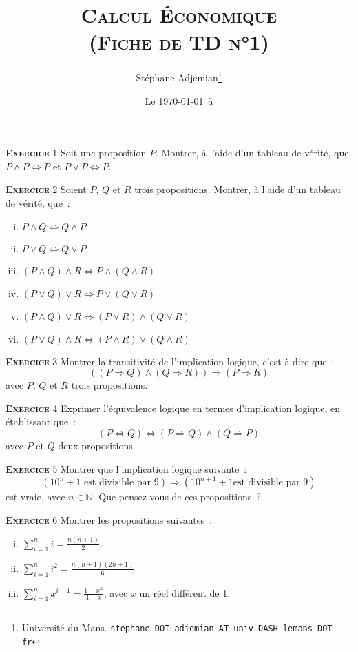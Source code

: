 \documentclass[10pt,a4paper,notitlepage]{article}
\newcommand{\exercice}[1]{\textsc{\textbf{Exercice}} #1}
\begin{document}
\title{\textsc{Calcul Économique\\ \small{(Fiche de TD n°1)}}}
\author{Stéphane Adjemian\thanks{Université du Mans. \texttt{stephane DOT adjemian AT univ DASH lemans DOT fr}}}
\date{Le \today\ à \thistime}

\maketitle

\exercice{1} Soit une proposition $P$. Montrer, à l'aide d'un tableau
de vérité, que $P \land P \Leftrightarrow P$ et $P \lor P
\Leftrightarrow P$.

\bigskip

\exercice{2} Soient $P$, $Q$ et $R$ trois propositions. Montrer, à l'aide d'un tableau
de vérité, que~:
\begin{enumerate}[(i)]
\item $P \land Q \Leftrightarrow Q \land P$
\item $P \lor Q \Leftrightarrow Q \lor P$
\item $(P \land Q) \land R \Leftrightarrow P \land (Q \land R)$
\item $(P \lor Q) \lor R \Leftrightarrow P \lor (Q \lor R)$
\item $(P \land Q) \lor R \Leftrightarrow (P \lor R) \land (Q \lor R)$
\item $(P \lor Q) \land R \Leftrightarrow (P \land R) \lor (Q \land R)$
\end{enumerate}

\bigskip

\exercice{3} Montrer la transitivité de l'implication logique, c'est-à-dire
que~:
\[
((P \Rightarrow Q) \land (Q \Rightarrow R)) \Rightarrow (P \Rightarrow R)
\]
avec $P$, $Q$ et $R$ trois propositions.

\bigskip

\exercice{4} Exprimer l'équivalence logique en termes d'implication logique, en
établissant que~:
\[
(P \Leftrightarrow Q) \Leftrightarrow (P \Rightarrow Q) \land (Q
\Rightarrow P)
\]
avec $P$ et $Q$ deux propositions.

\bigskip

\exercice{5} Montrer que l'implication logique suivante~:
\[
(10^n+1 \text{ est divisible par } 9) \Rightarrow (10^{n+1}+1 \text{
  est divisible par 9})
\]
est vraie, avec $n\in\mathbb N$. Que pensez vous de ces propositions ?

\bigskip

\exercice{6} Montrer les propositions suivantes~:
\begin{enumerate}[(i)]
\item $\sum_{i=1}^n i = \frac{n(n+1)}{2}$.
\item $\sum_{i=1}^n i^2 = \frac{n(n+1)(2n+1)}{6}$.
\item $\sum_{i=1}^nx^{i-1} = \frac{1-x^{n}}{1-x}$, avec $x$ un réel différent de 1.
\end{enumerate}
\end{document}
